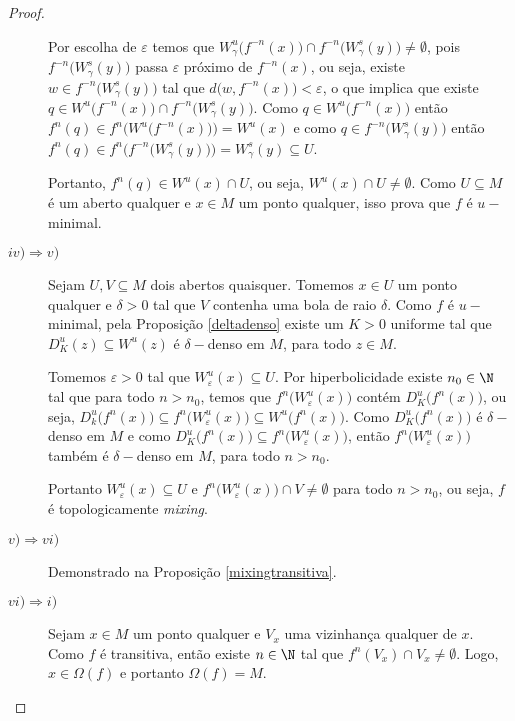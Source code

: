 \begin{proof}
\begin{description}
Por escolha de $\varepsilon$ temos que $W^{u}_{\gamma}\big(f^{-n}(x)\big)\cap f^{-n}\big(W^{s}_{\gamma}(y)\big)\neq \emptyset$, pois $f^{-n}\big(W^{s}_{\gamma}(y)\big)$ passa $\varepsilon$ próximo de $f^{-n}(x)$, ou seja, existe $w\in f^{-n}\big(W^{s}_{\gamma}(y)\big)$ tal que $d\big(w,f^{-n}(x)\big)<\varepsilon$, o que implica que existe $q\in W^{u}\big(f^{-n}(x)\big)\cap f^{-n}\big(W^{s}_{\gamma}(y)\big)$. Como $q\in W^{u}\big(f^{-n}(x)\big)$ então $f^n(q)\in f^n\Big(W^{u}\big(f^{-n}(x)\big)\Big)=W^{u}(x)$ e como $q\in f^{-n}\big(W^{s}_{\gamma}(y)\big)$ então $f^n(q)\in f^{n}\Big(f^{-n}\big(W^{s}_{\gamma}(y)\big)\Big)=W^{s}_{\gamma}(y)\subseteq U$.

Portanto, $f^n(q)\in W^{u}(x)\cap U$, ou seja, $W^{u}(x)\cap U\neq\emptyset$. Como $U\subseteq M$ é um aberto qualquer e $x\in M$ um ponto qualquer, isso prova que $f$ é $u-$minimal.

\item[$iv)\Rightarrow v)$] Sejam $U,V\subseteq M$ dois abertos quaisquer. Tomemos $x\in U$ um ponto qualquer e $\delta>0$ tal que $V$ contenha uma bola de raio $\delta$. Como $f$ é $u-$minimal, pela Proposição \ref{deltadenso} existe um $K>0$ uniforme tal que $D_{K}^{u}(z)\subseteq W^u(z)$ é $\delta-$denso em $M$, para todo $z\in M$.

Tomemos $\varepsilon>0$ tal que $W^{u}_{\varepsilon}(x)\subseteq U$. Por hiperbolicidade existe $n_0\in\N$ tal que para todo $n>n_0$, temos que $f^n\big(W^{u}_{\varepsilon}(x)\big)$ contém $D_{K}^{u}\big(f^n(x)\big)$, ou seja, $D_{k}^{u}\big(f^n(x)\big)\subseteq f^n\big(W^{u}_{\varepsilon}(x)\big)\subseteq W^{u}\big(f^n(x)\big)$. Como $D^{u}_{K}\big(f^n(x)\big)$ é $\delta-$denso em $M$ e como $D^{u}_{K}\big(f^n(x)\big)\subseteq f^n\big(W^{u}_{\varepsilon}(x)\big)$, então $f^n\big(W^{u}_{\varepsilon}(x)\big)$ também é $\delta-$denso em $M$, para todo $n>n_0$. 

Portanto $W^{u}_{\varepsilon}(x)\subseteq U$ e $f^n\big(W^{u}_{\varepsilon}(x)\big)\cap V\neq\emptyset$ para todo $n>n_0$, ou seja, $f$ é topologicamente \textit{mixing}.

\item[$v)\Rightarrow vi)$] Demonstrado na Proposição \ref{mixingtransitiva}.

\item[$vi)\Rightarrow i)$] Sejam $x\in M$ um ponto qualquer e $V_x$ uma vizinhança qualquer de $x$. Como $f$ é transitiva, então existe $n\in\N$ tal que $f^n(V_x)\cap V_x\neq\emptyset$. Logo, $x\in\Omega(f)$ e portanto $\Omega(f)=M$.
\end{description}\end{proof}

%